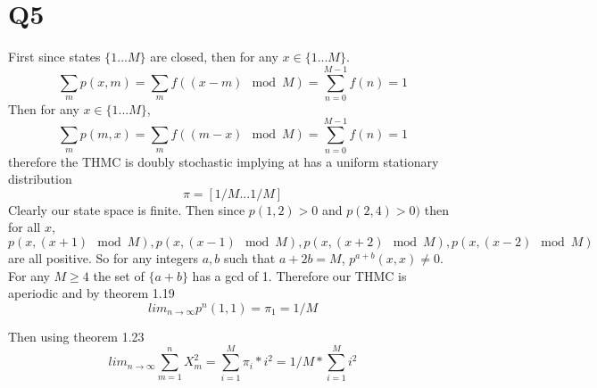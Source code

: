 \documentclass{article}
\begin{document}
\section*{Q5}
First since states $\{1 ... M \}$ are closed, then for any $x \in \{1 ... M\}$. 
\[
\sum_m p(x,m) = \sum_m f((x-m) \mod M) = \sum_{n = 0}^{M-1} f(n) = 1
\]
Then for any $x \in \{1 ... M\}$,
\[
\sum_m p(m,x) = \sum_m f((m-x) \mod M) = \sum_{n = 0}^{M-1} f(n) = 1
\]
therefore the THMC is doubly stochastic implying at has a uniform stationary distribution
\[
\pi = [1/M ... 1/M]
\]
Clearly our state space is finite. Then since $p(1,2) > 0$ and $p(2,4) > 0)$
then for all $x$, $p(x,(x+1) \mod M) , p(x, (x-1) \mod M), p(x, (x+2) \mod M) ,  p(x, (x-2) \mod M)$ are all positive. So for any integers $a,b$ such that $a + 2b = M$, $p^{a+b}(x,x) \neq 0$. For any $M \geq 4$ the set of $\{a+b\}$ has a gcd of 1. Therefore our THMC is aperiodic and by theorem 1.19
\[
lim_{n \to \infty} p^n(1,1) = \pi_1 = 1/M
\]

Then using theorem 1.23
\[
lim_{n \to \infty} \sum_{m = 1}^n X_m^2 = \sum_{i= 1} ^M \pi_i * i^2 = 1/M * \sum_{i = 1}^M i^2
\]
\end{document}
